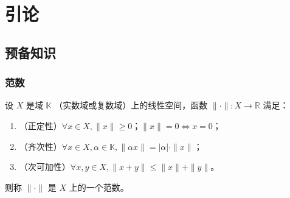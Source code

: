 \documentclass[cn]{elegantbook}
\title{}
\author{龚梓阳}
\date{\zhtoday}
\begin{document}
\frontmatter
\maketitle
\tableofcontents

\mainmatter
\chapter{引论}

\section{预备知识}

\subsection{范数}

\begin{definition}[范数]
    设 $X$ 是域 $\mathbb{K}$ （实数域或复数域）上的线性空间，函数 $\|\cdot\|:X\rightarrow\mathbb{R}$ 满足：
    \begin{enumerate}
        \item （正定性）$\forall x\in X, \|x\|\geq0$；$\|x\|=0\iff x=0$；
        \item （齐次性）$\forall x\in X, \alpha\in\mathbb{K}, \|\alpha x\|=|\alpha|\cdot\|x\|$；
        \item （次可加性）$\forall x,y\in X, \|x+y\|\leq\|x\|+\|y\|$。
    \end{enumerate}
    则称 $\|\cdot\|$ 是 $X$ 上的一个范数。
\end{definition}
\end{document}
